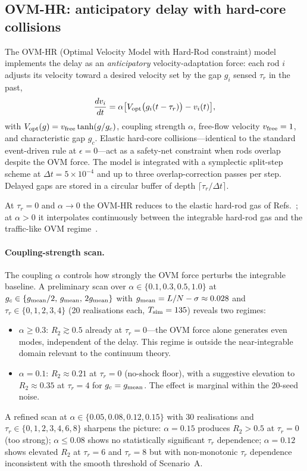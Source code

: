 \documentclass[aps,pre,twocolumn,superscriptaddress,longbibliography,floatfix]{revtex4-2}
\begin{document}
\subsection{OVM-HR: anticipatory delay with hard-core
  collisions}\label{sec:ovm}

The OVM-HR (Optimal Velocity Model with Hard-Rod constraint)
model implements the delay as an \emph{anticipatory}
velocity-adaptation force: each rod $i$ adjusts its velocity
toward a desired velocity set by the gap $g_i$ sensed
$\tau_r$ in the past,
\begin{equation}
\frac{dv_i}{dt} = \alpha\bigl[V_{\rm opt}\bigl(g_i(t-\tau_r)
\bigr) - v_i(t)\bigr],
\label{eq:ovm}
\end{equation}
with $V_{\rm opt}(g)=v_{\rm free}\tanh(g/g_c)$, coupling
strength $\alpha$, free-flow velocity $v_{\rm free}=1$, and
characteristic gap $g_c$. Elastic hard-core
collisions---identical to the standard event-driven rule at
$\epsilon=0$---act as a safety-net constraint when rods
overlap despite the OVM force. The model is integrated with a
symplectic split-step scheme at $\Delta t=5\times 10^{-4}$
and up to three overlap-correction passes per step. Delayed
gaps are stored in a circular buffer of depth
$\lceil\tau_r/\Delta t\rceil$.

At $\tau_r=0$ and $\alpha\to 0$ the OVM-HR reduces to the
elastic hard-rod gas of Refs.~\cite{PaperIII,PaperIV}; at
$\alpha>0$ it interpolates continuously between the
integrable hard-rod gas and the traffic-like OVM
regime~\cite{Bando1995}.

\paragraph*{Coupling-strength scan.}
The coupling $\alpha$ controls how strongly the OVM force
perturbs the integrable baseline. A preliminary scan over
$\alpha\in\{0.1, 0.3, 0.5, 1.0\}$ at $g_c\in\{g_{\rm
mean}/2,\, g_{\rm mean},\, 2g_{\rm mean}\}$ with
$g_{\rm mean}=L/N-\sigma\approx 0.028$ and
$\tau_r\in\{0, 1, 2, 3, 4\}$ (20 realisations each,
$T_{\rm sim}=135$) reveals two regimes:
\begin{itemize}
\item $\alpha\geq 0.3$: $R_2\gtrsim 0.5$ already at
  $\tau_r=0$---the OVM force alone generates even modes,
  independent of the delay. This regime is outside the
  near-integrable domain relevant to the continuum theory.
\item $\alpha=0.1$: $R_2\approx 0.21$ at $\tau_r=0$ (no-shock
  floor), with a suggestive elevation to $R_2\approx 0.35$ at
  $\tau_r=4$ for $g_c=g_{\rm mean}$. The effect is marginal
  within the 20-seed noise.
\end{itemize}
A refined scan at
$\alpha\in\{0.05, 0.08, 0.12, 0.15\}$ with 30 realisations
and $\tau_r\in\{0, 1, 2, 3, 4, 6, 8\}$ sharpens the picture:
$\alpha=0.15$ produces $R_2>0.5$ at $\tau_r=0$ (too strong);
$\alpha\leq 0.08$ shows no statistically significant $\tau_r$
dependence; $\alpha=0.12$ shows elevated $R_2$ at $\tau_r=6$
and $\tau_r=8$ but with non-monotonic $\tau_r$ dependence
inconsistent with the smooth threshold of Scenario~A.
\end{document}
